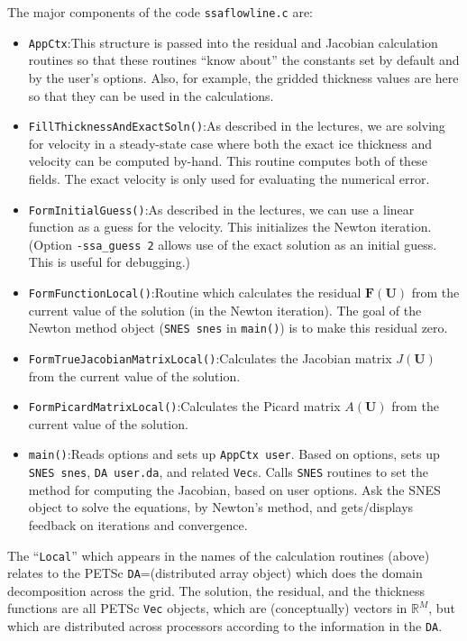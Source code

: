 \documentclass[11pt,final,reqno]{amsart}
\newcommand{\RR}{\mathbb{R}}
\newcommand{\bbF}{\mathbf{F}}
\newcommand{\bU}{\mathbf{U}}
\begin{document}
The major components of the code \texttt{ssaflowline.c} are:
\begin{itemize}
\item \texttt{AppCtx}:\quad This structure is passed into the residual and Jacobian calculation routines so that these routines ``know about'' the constants set by default and by the user's options.  Also, for example, the gridded thickness values are here so that they can be used in the calculations.
\item \texttt{FillThicknessAndExactSoln()}:\quad As described in the lectures, we are solving for velocity in a steady-state case where both the exact ice thickness and velocity can be computed by-hand.  This routine computes both of these fields.  The exact velocity is only used for evaluating the numerical error.
\item \texttt{FormInitialGuess()}:\quad As described in the lectures, we can use a linear function as a guess for the velocity.  This initializes the Newton iteration.  (Option \texttt{-ssa\_guess 2} allows use of the exact solution as an initial guess.  This is useful for debugging.)
\item \texttt{FormFunctionLocal()}:\quad  Routine which calculates the residual $\bbF(\bU)$ from the current value of the solution  (in the Newton iteration).  The goal of the Newton method object (\texttt{SNES snes} in \texttt{main()}) is to make this residual zero.
\item \texttt{FormTrueJacobianMatrixLocal()}:\quad Calculates the Jacobian matrix $J(\bU)$ from the current value of the solution.
\item \texttt{FormPicardMatrixLocal()}:\quad Calculates the Picard matrix $A(\bU)$ from the current value of the solution.
\item \texttt{main()}:\quad  Reads options and sets up \texttt{AppCtx user}.  Based on options, sets up \texttt{SNES snes}, \texttt{DA user.da}, and related \texttt{Vec}s.  Calls \texttt{SNES} routines to set the method for computing the Jacobian, based on user options.  Ask the SNES object to solve the equations, by Newton's method, and gets/displays feedback on iterations and convergence.
\end{itemize}

The ``\texttt{Local}'' which appears in the names of the calculation routines (above) relates to the PETSc \texttt{DA}=(distributed array object) which does the domain decomposition across the grid.  The solution, the residual, and the thickness functions are all PETSc \texttt{Vec} objects, which are (conceptually) vectors in $\RR^M$, but which are distributed across processors according to the information in the \texttt{DA}.
\end{document}
